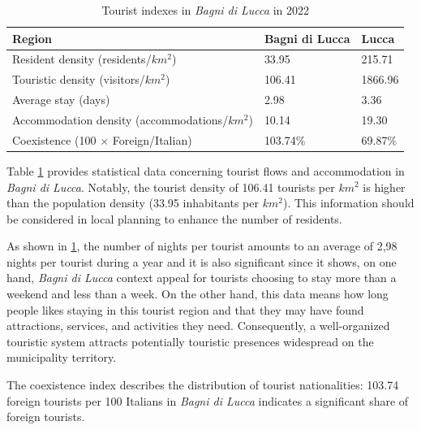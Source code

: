 \documentclass[sustainability,article,submit,pdftex,moreauthors]{Definitions/mdpi}
\begin{document}
\begin{table}
    \footnotesize
    \centering
    \begin{tabular}{l||l|l} \hline 
        {\bf Region} & {\bf Bagni di Lucca} & {\bf Lucca} \\ \hline
        Resident density (residents/{$km^2$}) & 33.95 & 215.71 \\
        Touristic density (visitors/{$km^2$}) & 106.41 & 1866.96 \\
        Average stay  (days) &  2.98 &  3.36 \\
        Accommodation density (accommodations/{$km^2$}) & 10.14 & 19.30 \\
        Coexistence (100 $\times$ Foreign/Italian) & 103.74\% &  69.87\% \\ 
         \hline
    \end{tabular}
    \caption{Tourist indexes in \emph{Bagni di Lucca} in 2022
}
    \label{tab:tourism}
\end{table}

Table \ref{tab:tourism} provides statistical data concerning tourist flows and accommodation in \emph{Bagni di Lucca}. Notably, the tourist density of 106.41 tourists per $km^2$ is higher than the population density (33.95 inhabitants per $km^2$). This information should be considered in local planning to enhance the number of residents.

As shown in \ref{tab:tourism}, the number of nights per tourist amounts to an average of 2,98 nights per tourist during a year and it is also significant since it shows, on one hand, \emph{Bagni di Lucca} context appeal for tourists choosing to stay more than a weekend and less than a week. On the other hand, this data means how long people likes staying in this tourist region and that they may have found attractions, services, and activities they need. Consequently, a well-organized touristic system attracts potentially touristic presences widespread on the municipality territory.

The coexistence index describes the distribution of tourist nationalities: 103.74 foreign tourists per 100 Italians in \emph{Bagni di Lucca} indicates a significant share of foreign tourists.
\end{document}

